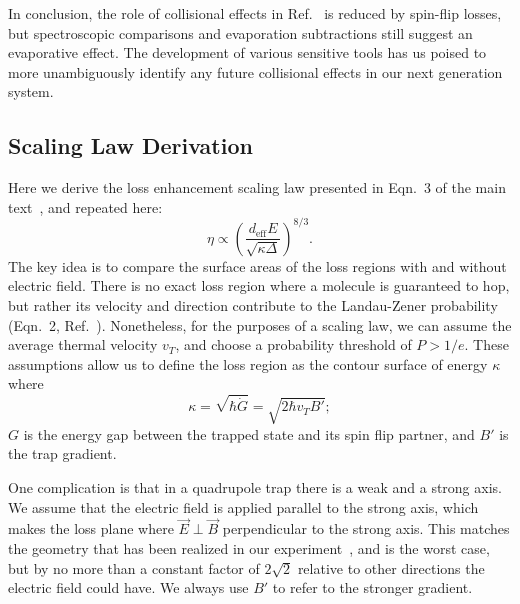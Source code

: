 \documentclass[%
 reprint,
 amsmath,amssymb,
 aps,
pra,
]{revtex4-1}
\begin{document}
In conclusion, the role of collisional effects in Ref.~\cite{Stuhl2013} is reduced by spin-flip losses,
but spectroscopic comparisons and evaporation subtractions still suggest an evaporative effect. 
The development of various sensitive tools has us poised to more unambiguously identify any future collisional effects in our next generation system.

\subsection{Scaling Law Derivation\label{sec:der}}

Here we derive the loss enhancement scaling law presented in Eqn.~3 of the main text~\cite{smt}, and repeated here:
\begin{equation}
\eta\propto \left(\frac{d_\text{eff}E}{\sqrt{\kappa\Delta}}\right)^{8/3}.
\end{equation}
The key idea is to compare the surface areas of the loss regions with and without electric field. 
There is no exact loss region where a molecule is guaranteed to hop, but rather its velocity and direction contribute to the Landau-Zener probability (Eqn.~2, Ref.~\cite{smt}).
Nonetheless, for the purposes of a scaling law, we can assume the average thermal velocity $v_T$, and choose a probability threshold of $P>1/e$.
These assumptions allow us to define the loss region as the contour surface of energy $\kappa$ where 
\begin{equation}
\kappa=\sqrt{\hbar\dot{G}}=\sqrt{2\hbar v_T B'};
\end{equation} 
$G$ is the energy gap between the trapped state and its spin flip partner, and $B'$ is the trap gradient.

One complication is that in a quadrupole trap there is a weak and a strong axis.
We assume that the electric field is applied parallel to the strong axis, which makes the loss plane where $\vec{E}\perp\vec{B}$ perpendicular to the strong axis. 
This matches the geometry that has been realized in our experiment~\cite{Stuhl2013}, and is the worst case, but by no more than a constant factor of $2\sqrt{2}$ relative to other directions the electric field could have.
We always use $B'$ to refer to the stronger gradient.
\end{document}
